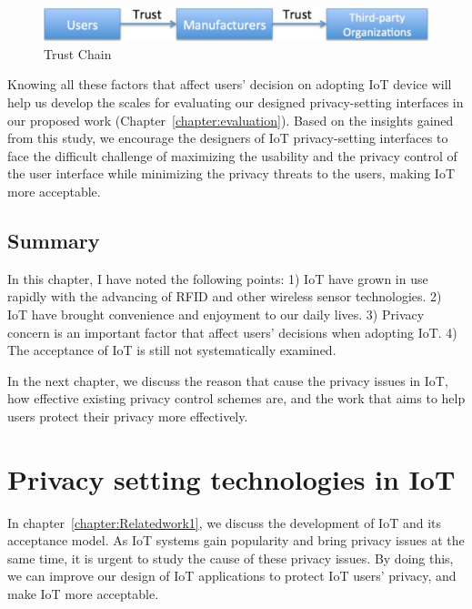 \begin{figure}
	\centering
	\includegraphics[width=0.75\columnwidth]{figures/trustchain.pdf}
	\caption{Trust Chain}
	\label{fig:trustchain}
\end{figure}

Knowing all these factors that affect users' decision on adopting IoT device will help us develop the scales for evaluating our designed privacy-setting interfaces in our proposed work (Chapter~\ref{chapter:evaluation}). Based on the insights gained from this study, we encourage the designers of IoT privacy-setting interfaces to face the difficult challenge of maximizing the usability and the privacy control of the user interface while minimizing the privacy threats to the users, making IoT more acceptable.

\section{Summary}
In this chapter, I have noted the following points: 1) IoT have grown in use rapidly with the advancing of RFID and other wireless sensor technologies. 2) IoT have brought convenience and enjoyment to our daily lives. 3) Privacy concern is an important factor that affect users' decisions when adopting IoT. 4) The acceptance of IoT is still not systematically examined.


In the next chapter, we discuss the reason that cause the privacy issues in IoT, how effective existing privacy control schemes are, and the work that aims to help users protect their privacy more effectively.



















\chapter{Privacy setting technologies in IoT}\label{chapter:Relatedwork2}
In chapter~\ref{chapter:Relatedwork1}, we discuss the development of IoT and its acceptance model. As IoT systems gain popularity and bring privacy issues at the same time, it is urgent to study the cause of these privacy issues. By doing this, we can improve our design of IoT applications to protect IoT users' privacy, and make IoT more acceptable.

